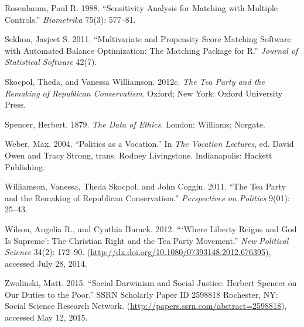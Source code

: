 \documentclass[12pt,]{article}
\begin{document}
Rosenbaum, Paul R. 1988. ``Sensitivity Analysis for Matching with
Multiple Controls.'' \emph{Biometrika} 75(3): 577--81.

Sekhon, Jasjeet S. 2011. ``Multivariate and Propensity Score Matching
Software with Automated Balance Optimization: The Matching Package for
R.'' \emph{Journal of Statistical Software} 42(7).

Skocpol, Theda, and Vanessa Williamson. 2012c. \emph{The Tea Party and
the Remaking of Republican Conservatism}. Oxford; New York: Oxford
University Press.

Spencer, Herbert. 1879. \emph{The Data of Ethics}. London: Williams;
Norgate.

Weber, Max. 2004. ``Politics as a Vocation.'' In \emph{The Vocation
Lectures}, ed. David Owen and Tracy Strong, trans. Rodney Livingstone.
Indianapolis: Hackett Publishing.

Williamson, Vanessa, Theda Skocpol, and John Coggin. 2011. ``The Tea
Party and the Remaking of Republican Conservatism.'' \emph{Perspectives
on Politics} 9(01): 25--43.

Wilson, Angelia R., and Cynthia Burack. 2012. ```Where Liberty Reigns
and God Is Supreme': The Christian Right and the Tea Party Movement.''
\emph{New Political Science} 34(2): 172--90.
(\url{http://dx.doi.org/10.1080/07393148.2012.676395}), accessed July
28, 2014.

Zwolinski, Matt. 2015. ``Social Darwinism and Social Justice: Herbert
Spencer on Our Duties to the Poor.'' SSRN Scholarly Paper ID 2598818
Rochester, NY: Social Science Research Network.
(\url{http://papers.ssrn.com/abstract=2598818}), accessed May 12, 2015.
\end{document}
